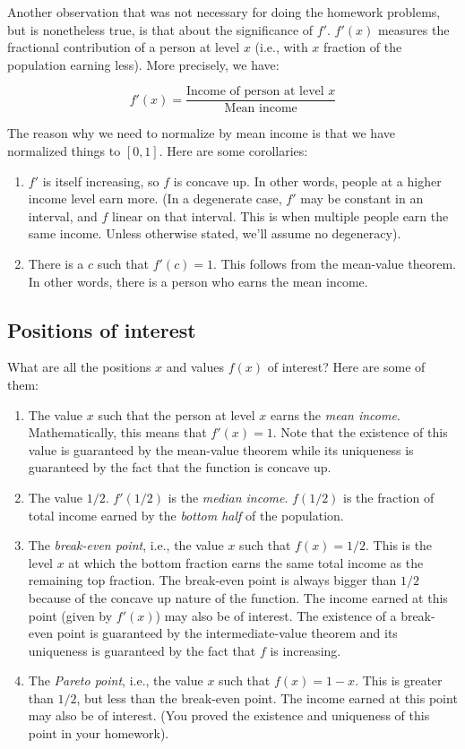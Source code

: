 \documentclass{amsart}
\begin{document}
Another observation that was not necessary for doing the homework
problems, but is nonetheless true, is that about the significance of
$f'$. $f'(x)$ measures the fractional contribution of a person at
level $x$ (i.e., with $x$ fraction of the population earning
less). More precisely, we have:

$$f'(x) = \frac{\text{Income of person at level $x$}}{\text{Mean income}}$$

The reason why we need to normalize by mean income is that we have
normalized things to $[0,1]$. Here are some corollaries:

\begin{enumerate}
\item $f'$ is itself increasing, so $f$ is concave up. In other words,
  people at a higher income level earn more. (In a degenerate case,
  $f'$ may be constant in an interval, and $f$ linear on that
  interval. This is when multiple people earn the same income. Unless
  otherwise stated, we'll assume no degeneracy).
\item There is a $c$ such that $f'(c) = 1$. This follows from the
  mean-value theorem. In other words, there is a person who earns the
  mean income.
\end{enumerate}

\subsection{Positions of interest}

What are all the positions $x$ and values $f(x)$ of interest? Here are
some of them:

\begin{enumerate}
\item The value $x$ such that the person at level $x$ earns the {\em
  mean income}. Mathematically, this means that $f'(x) = 1$. Note that
  the existence of this value is guaranteed by the mean-value theorem
  while its uniqueness is guaranteed by the fact that the function is
  concave up.
\item The value $1/2$. $f'(1/2)$ is the {\em median income}. $f(1/2)$
  is the fraction of total income earned by the {\em bottom half} of the
  population.
\item The {\em break-even point}, i.e., the value $x$ such that $f(x)
  = 1/2$. This is the level $x$ at which the bottom fraction earns the
  same total income as the remaining top fraction. The break-even
  point is always bigger than $1/2$ because of the concave up nature
  of the function. The income earned at this point (given by $f'(x)$)
  may also be of interest. The existence of a break-even point is
  guaranteed by the intermediate-value theorem and its uniqueness is
  guaranteed by the fact that $f$ is increasing.
\item The {\em Pareto point}, i.e., the value $x$ such that $f(x) = 1
  - x$. This is greater than $1/2$, but less than the break-even
  point. The income earned at this point may also be of interest. (You
  proved the existence and uniqueness of this point in your homework).
\end{enumerate}
\end{document}
